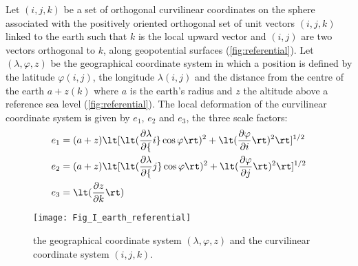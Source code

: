 \documentclass[../main/NEMO_manual]{subfiles}
\begin{document}
Let $(i,j,k)$ be a set of orthogonal curvilinear coordinates on
the sphere associated with the positively oriented orthogonal set of unit vectors
$(i,j,k)$ linked to the earth such that
$k$ is the local upward vector and $(i,j)$ are two vectors orthogonal to $k$,
\ie along geopotential surfaces (\autoref{fig:referential}).
Let $(\lambda,\varphi,z)$ be the geographical coordinate system in which a position is defined by
the latitude $\varphi(i,j)$, the longitude $\lambda(i,j)$ and
the distance from the centre of the earth $a + z(k)$ where $a$ is the earth's radius and
$z$ the altitude above a reference sea level (\autoref{fig:referential}).
The local deformation of the curvilinear coordinate system is given by $e_1$, $e_2$ and $e_3$,
the three scale factors:
\begin{equation}
  \label{eq:scale_factors}
  \begin{aligned}
    e_1 &= (a + z) \lt[ \lt( \pd[\lambda]{i} \cos \varphi \rt)^2 + \lt( \pd[\varphi]{i} \rt)^2 \rt]^{1/2} \\
    e_2 &= (a + z) \lt[ \lt( \pd[\lambda]{j} \cos \varphi \rt)^2 + \lt( \pd[\varphi]{j} \rt)^2 \rt]^{1/2} \\
    e_3 &= \lt( \pd[z]{k} \rt)
  \end{aligned}
\end{equation}

\begin{figure}[!tb]
  \begin{center}
    \texttt{[image: Fig\_I\_earth\_referential]}
    \caption{
      \protect\label{fig:referential}
      the geographical coordinate system $(\lambda,\varphi,z)$ and the curvilinear
      coordinate system $(i,j,k)$.
    }
  \end{center}
\end{figure}
\end{document}
